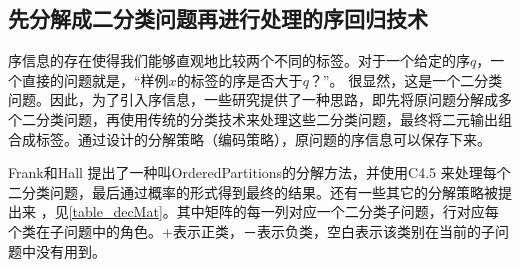 \subsection{先分解成二分类问题再进行处理的序回归技术}
序信息的存在使得我们能够直观地比较两个不同的标签。对于一个给定的序\(q\)，一个直接的问题就是，“样例\(x\)的标签的序是否大于\(q\)？”\citep{lin2012reduction}。
很显然，这是一个二分类问题。因此，为了引入序信息，一些研究提供了一种思路，即先将原问题分解成多个二分类问题，再使用传统的分类技术来处理这些二分类问题，最终将二元输出组合成标签。通过设计的分解策略（编码策略），原问题的序信息可以保存下来。

Frank和Hall\citep{frank2001simple}
提出了一种叫OrderedPartitions的分解方法，并使用C4.5\citep{quinlan2014c4}
来处理每个二分类问题，最后通过概率的形式得到最终的结果。还有一些其它的分解策略被提出来\citep{kwon1997ordinal}
，见\autoref{table_decMat}。其中矩阵的每一列对应一个二分类子问题，行对应每个类在子问题中的角色。+表示正类，－表示负类，空白表示该类别在当前的子问题中没有用到。

